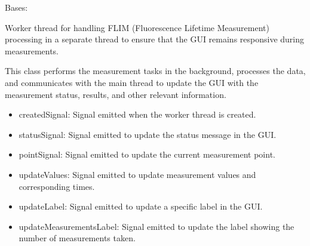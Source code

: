 \documentclass[letterpaper,10pt,english]{sphinxmanual}
\begin{document}

\begin{fulllineitems}
\label{\detokenize{FLIMGraphics:FLIMGraphics.WorkerThreadFLIM}}
\pysigstartsignatures
{}
\pysigstopsignatures
\sphinxAtStartPar
Bases: 

\sphinxAtStartPar
Worker thread for handling FLIM (Fluorescence Lifetime Measurement) processing in a separate thread 
to ensure that the GUI remains responsive during measurements.

\sphinxAtStartPar
This class performs the measurement tasks in the background, processes the data, and communicates with 
the main thread to update the GUI with the measurement status, results, and other relevant information.
\begin{description}
\begin{itemize}
\item {} 
\sphinxAtStartPar
createdSignal: Signal emitted when the worker thread is created.

\item {} 
\sphinxAtStartPar
statusSignal: Signal emitted to update the status message in the GUI.

\item {} 
\sphinxAtStartPar
pointSignal: Signal emitted to update the current measurement point.

\item {} 
\sphinxAtStartPar
updateValues: Signal emitted to update measurement values and corresponding times.

\item {} 
\sphinxAtStartPar
updateLabel: Signal emitted to update a specific label in the GUI.

\item {} 
\sphinxAtStartPar
updateMeasurementsLabel: Signal emitted to update the label showing the number of measurements taken.


\end{itemize}
\end{description}
\end{fulllineitems}
\end{document}
